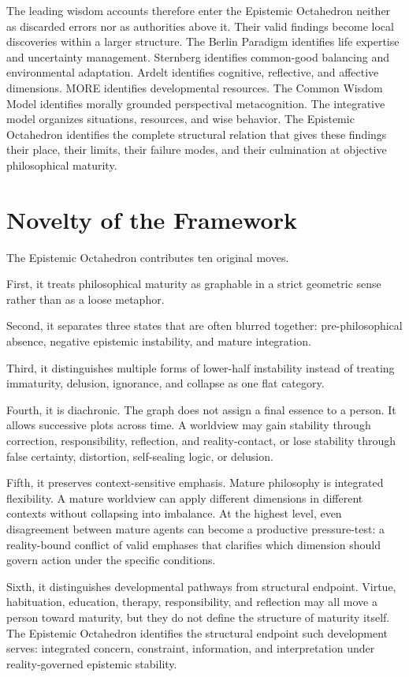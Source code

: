 \documentclass[11pt]{article}
\begin{document}
The leading wisdom accounts therefore enter the Epistemic Octahedron neither as discarded errors nor as authorities above it. Their valid findings become local discoveries within a larger structure. The Berlin Paradigm identifies life expertise and uncertainty management. Sternberg identifies common-good balancing and environmental adaptation. Ardelt identifies cognitive, reflective, and affective dimensions. MORE identifies developmental resources. The Common Wisdom Model identifies morally grounded perspectival metacognition. The integrative model organizes situations, resources, and wise behavior. The Epistemic Octahedron identifies the complete structural relation that gives these findings their place, their limits, their failure modes, and their culmination at objective philosophical maturity.

\section{Novelty of the Framework}

The Epistemic Octahedron contributes ten original moves.

First, it treats philosophical maturity as graphable in a strict geometric sense rather than as a loose metaphor.

Second, it separates three states that are often blurred together: pre-philosophical absence, negative epistemic instability, and mature integration.

Third, it distinguishes multiple forms of lower-half instability instead of treating immaturity, delusion, ignorance, and collapse as one flat category.

Fourth, it is diachronic. The graph does not assign a final essence to a person. It allows successive plots across time. A worldview may gain stability through correction, responsibility, reflection, and reality-contact, or lose stability through false certainty, distortion, self-sealing logic, or delusion.

Fifth, it preserves context-sensitive emphasis. Mature philosophy is integrated flexibility. A mature worldview can apply different dimensions in different contexts without collapsing into imbalance. At the highest level, even disagreement between mature agents can become a productive pressure-test: a reality-bound conflict of valid emphases that clarifies which dimension should govern action under the specific conditions.

Sixth, it distinguishes developmental pathways from structural endpoint. Virtue, habituation, education, therapy, responsibility, and reflection may all move a person toward maturity, but they do not define the structure of maturity itself. The Epistemic Octahedron identifies the structural endpoint such development serves: integrated concern, constraint, information, and interpretation under reality-governed epistemic stability.
\end{document}
